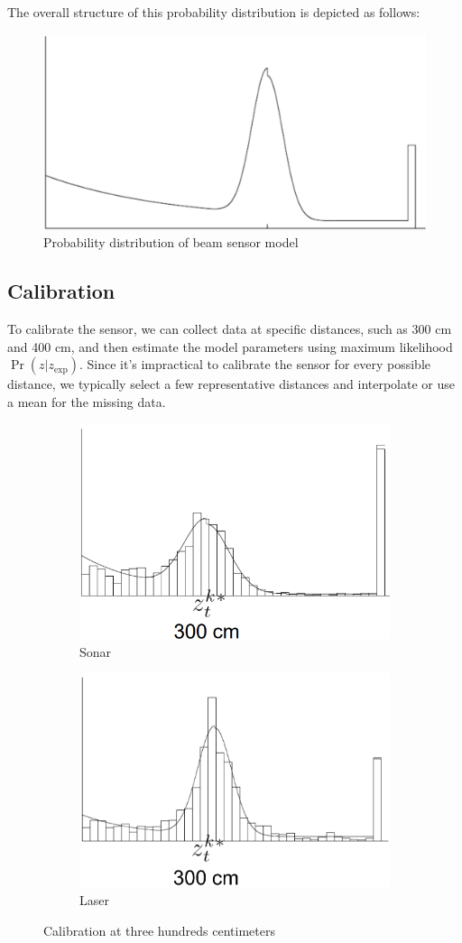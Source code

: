 The overall structure of this probability distribution is depicted as follows:
\begin{figure}[H]
    \centering
    \includegraphics[width=0.6\linewidth]{images/bsm.png}
    \caption{Probability distribution of beam sensor model}
\end{figure}

\subsection{Calibration}
To calibrate the sensor, we can collect data at specific distances, such as 300 cm and 400 cm, and then estimate the model parameters using maximum likelihood $\Pr(z|z_{\text{exp}})$.
Since it's impractical to calibrate the sensor for every possible distance, we typically select a few representative distances and interpolate or use a mean for the missing data.
\begin{figure}[H]
    \centering
    \begin{subfigure}{0.49\textwidth}
        \centering
        \includegraphics[width=0.75\linewidth]{images/sonarcalib.png} 
        \caption{Sonar}
    \end{subfigure}
    \begin{subfigure}{0.49\textwidth}
        \centering
        \includegraphics[width=0.75\linewidth]{images/lasercalib.png}
        \caption{Laser}
    \end{subfigure}
    \caption{Calibration at three hundreds centimeters}
\end{figure}
